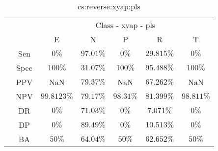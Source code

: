 \begin{table}[!ht]
	\centering
	\begin{tabular}{|c|c|c|c|c|c|c|}
		\cline{3-7}
		\multicolumn{2}{c|}{} & \multicolumn{5}{c|}{Class - xyap - pls} \\ \cline{3-7}
		\multicolumn{2}{c|}{} & E & N & P & R & T \\ \hline
		\multirow{7}{*}{\rotatebox{90}{Statistics}} & Sen & $0\%$ & $97.01\%$ & $0\%$ & $29.815\%$ & $0\%$ \\ \cline{2-7}
		 & Spec & $100\%$ & $31.07\%$ & $100\%$ & $95.488\%$ & $100\%$ \\ \cline{2-7}
		 & PPV & NaN & $79.37\%$ & NaN & $67.262\%$ & NaN \\ \cline{2-7}
		 & NPV & $99.8123\%$ & $79.17\%$ & $98.31\%$ & $81.399\%$ & $98.811\%$ \\ \cline{2-7}
		 & DR & $0\%$ & $71.03\%$ & $0\%$ & $7.071\%$ & $0\%$ \\ \cline{2-7}
		 & DP & $0\%$ & $89.49\%$ & $0\%$ & $10.513\%$ & $0\%$ \\ \cline{2-7}
		 & BA & $50\%$ & $64.04\%$ & $50\%$ & $62.652\%$ & $50\%$ \\ \hline
	\end{tabular}
	\caption{cs:reverse:xyap:pls}
	\label{tab:cs:reverse:xyap:pls}
\end{table}
